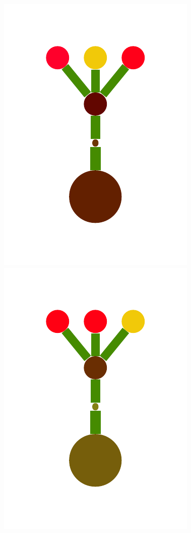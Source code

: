 \documentclass[a4paper,10pt]{article}
\begin{document}
\begin{figure}[t]
  \includegraphics[scale=.26]{../figures/vector/2-2-initProgram-4.pdf}
  \includegraphics[scale=.26]{../figures/vector/2-2-initProgram-5.pdf}

\end{figure}
\end{document}
